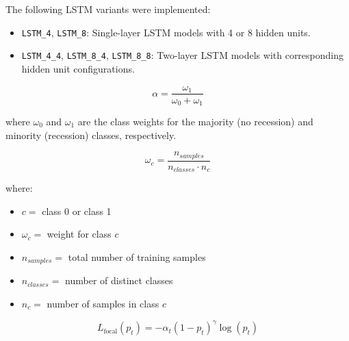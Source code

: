 
The following LSTM variants were implemented:

\begin{itemize}
\item \texttt{LSTM\_4}, \texttt{LSTM\_8}: Single-layer LSTM models with 4 or 8 hidden units.
\item \texttt{LSTM\_4\_4}, \texttt{LSTM\_8\_4}, \texttt{LSTM\_8\_8}: Two-layer LSTM models with corresponding hidden unit configurations.
\end{itemize}





\vspace{-24pt}

\begin{equation}
\alpha = \frac{\omega_1}{\omega_0 + \omega_1} %
\label{eq:alpha}
\end{equation}

where $\omega_0$ and $\omega_1$ are the class weights for the majority (no recession) and minority (recession) classes, respectively.

\vspace{-24pt}

\begin{equation}
\omega_c = \frac{n_{samples}}{n_{classes} \cdot n_c}
\label{eq:class_weight}
\end{equation}

\noindent
where:
\vspace{-9pt}
\begin{itemize} [itemsep = -6pt]
    \item $c = $ class 0 or class 1
    \item $\omega_c = $ weight for class $c$
    \item $n_{samples} = $ total number of training samples
    \item $n_{classes} = $ number of distinct classes
    \item $n_c = $ number of samples in class $c$
\end{itemize}

\vspace{-24pt}

\begin{equation}
L_{\text{focal}}(p_t) = -\alpha_t (1 - p_t)^\gamma \log(p_t)
\label{eq:binary_focal_loss_function}
\end{equation}

